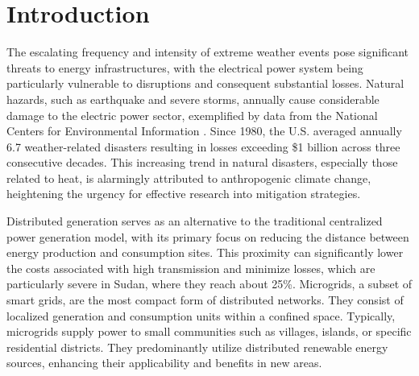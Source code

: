 \documentclass[conference]{IEEEtran}
\begin{document}
\section{Introduction}
The escalating frequency and intensity of extreme weather events pose significant threats to energy infrastructures, with the electrical power system being particularly vulnerable to disruptions and consequent substantial losses. Natural hazards, such as earthquake and severe storms, annually cause considerable damage to the electric power sector, exemplified by data from the National Centers for Environmental Information \cite{b6}. Since 1980, the U.S. averaged annually 6.7 weather-related disasters resulting in losses exceeding \$1 billion across three consecutive decades. This increasing trend in natural disasters, especially those related to heat, is alarmingly attributed to anthropogenic climate change, heightening the urgency for effective research into mitigation strategies. 

Distributed generation serves as an alternative to the traditional centralized power generation model, with its primary focus on reducing the distance between energy production and consumption sites. This proximity can significantly lower the costs associated with high transmission and minimize losses, which are particularly severe in Sudan, where they reach about 25\%. Microgrids, a subset of smart grids, are the most compact form of distributed networks. They consist of localized generation and consumption units within a confined space. Typically, microgrids supply power to small communities such as villages, islands, or specific residential districts. They predominantly utilize distributed renewable energy sources, enhancing their applicability and benefits in new areas.
\end{document}
